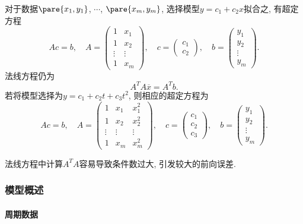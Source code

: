 \documentclass[20pt]{extarticle}
\begin{document}
对于数据$\pare{x_1,y_1}$, $\cdots$, $\pare{x_m,y_m}$, 选择模型$y = c_1 + c_2 x$拟合之, 有超定方程
\[ Ac=b,\quad A = \begin{pmatrix}
    1 & x_1 \\ 1 & x_2 \\ \vdots & \vdots \\ 1 & x_m
\end{pmatrix},\quad c = \begin{pmatrix}
    c_1 \\ c_2
\end{pmatrix},\quad b = \begin{pmatrix}
    y_1 \\ y_2 \\ \vdots \\ y_m
\end{pmatrix}. \]
法线方程仍为
\[ A^T A\overbar{x} = A^T b. \]
若将模型选择为$y = c_1 + c_2t + c_3t^2$, 则相应的超定方程为
\[ Ac=b,\quad A = \begin{pmatrix}
    1 & x_1 & x_1^2 \\
    1 & x_2 & x_2^2 \\
    \vdots & \vdots & \vdots \\
    1 & x_m & x_m^2
\end{pmatrix},\quad c = \begin{pmatrix}
    c_1 \\ c_2 \\ c_3
\end{pmatrix},\quad b = \begin{pmatrix}
    y_1 \\ y_2 \\ \vdots \\ y_m
\end{pmatrix}. \]

\begin{remark}
    法线方程中计算$A^TA$容易导致条件数过大, 引发较大的前向误差.
\end{remark}



\subsubsection{模型概述} %
\label{ssub:模型概述}

\paragraph{周期数据} %
\label{par:周期数据}
\end{document}
